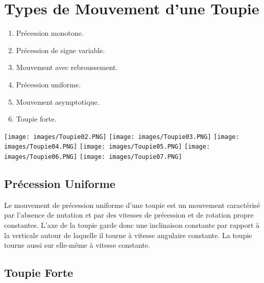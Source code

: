 \documentclass[a4paper]{article}
\begin{document}
\section{Types de Mouvement d'une Toupie}





\begin{enumerate}

    \item Précession monotone.
    \item Précession de signe variable.
    \item Mouvement avec rebroussement.
    \item Précession uniforme.
    \item Mouvement asymptotique.
    \item Toupie forte.

\end{enumerate}

\begin{center}
\texttt{[image: images/Toupie02.PNG]}
\texttt{[image: images/Toupie03.PNG]}
\texttt{[image: images/Toupie04.PNG]}
\texttt{[image: images/Toupie05.PNG]}
\texttt{[image: images/Toupie06.PNG]}
\texttt{[image: images/Toupie07.PNG]}
\end{center}





\subsection{Précession Uniforme}





Le mouvement de précession uniforme d’une toupie est un mouvement caractérisé par l’absence de nutation et par des vitesses de précession et de rotation propre constantes. L’axe de la toupie garde donc une inclinaison constante par rapport à la verticale autour de laquelle il tourne à vitesse angulaire constante. La toupie tourne aussi sur elle-même à vitesse constante.






\subsection{Toupie Forte}
\end{document}
